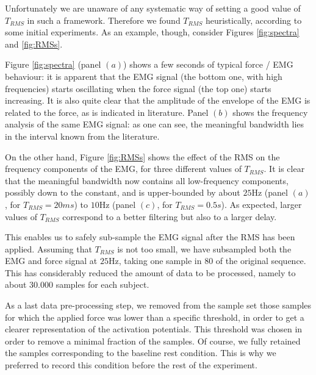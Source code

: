 Unfortunately we are unaware of any systematic way of setting a good value of $T_{RMS}$ in such a framework. Therefore we found $T_{RMS}$ heuristically, according to some initial experiments. As an example, though, consider Figures \ref{fig:spectra} and \ref{fig:RMSs}.

Figure \ref{fig:spectra} (panel $(a)$) shows a few seconds of typical force / EMG behaviour: it is apparent that the EMG signal (the bottom one, with high frequencies) starts oscillating when the force signal (the top one) starts increasing. It is also quite clear that the amplitude of the envelope of the EMG is related to the force, as is indicated in literature. Panel $(b)$ shows the frequency analysis of the same EMG signal: as one can see, the meaningful bandwidth lies in the interval known from the literature.

On the other hand, Figure \ref{fig:RMSs} shows the effect of the RMS on the frequency components of the EMG, for three different values of $T_{RMS}$. It is clear that the meaningful bandwidth now contains all low-frequency components, possibly down to the constant, and is upper-bounded by about $25$Hz (panel $(a)$, for $T_{RMS}=20ms$) to $10$Hz (panel $(c)$, for $T_{RMS}=0.5s$). As expected, larger values of $T_{RMS}$ correspond to a better filtering but also to a larger delay.

This enables us to safely sub-sample the EMG signal after the RMS has been applied. Assuming that $T_{RMS}$ is not too small, we have subsampled both the EMG and force signal at $25$Hz, taking one sample in $80$ of the original sequence. This has considerably reduced the amount of data to be processed, namely to about $30.000$ samples for each subject.

As a last data pre-processing step, we removed from the sample set those samples for which the applied force was lower than a specific threshold, in order to get a clearer representation of the activation potentials. This threshold was chosen in order to remove a minimal fraction of the samples. Of course, we fully retained the samples corresponding to the baseline rest condition. This is why we preferred to record this condition before the rest of the experiment.